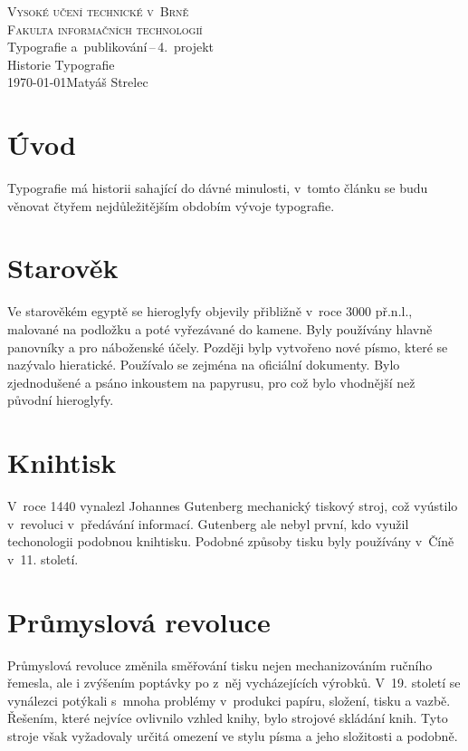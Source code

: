 \documentclass[a4paper, 11pt]{article}
\begin{document}
\begin{titlepage}
    \begin{center}
		{\Huge{\textsc{Vysoké učení technické v~Brně}}\\
        \huge{\textsc{Fakulta informačních technologií}}\\}
		\LARGE{Typografie a~publikování\,{}--\,{}4.\ projekt}\\
        \Huge{Historie Typografie\\}
        {\Large{\today \hfill Matyáš Strelec}}
	\end{center}
\end{titlepage}

\pagebreak

\section{Úvod}
Typografie má historii sahající do dávné minulosti, v~tomto článku se budu věnovat
čtyřem nejdůležitějším obdobím vývoje typografie.

\section{Starověk}
Ve starověkém egyptě se hieroglyfy objevily přibližně v~roce 3000 př.n.l., malované na podložku a poté
vyřezávané do kamene. Byly používány hlavně panovníky a pro náboženské účely. Později bylp vytvořeno nové
písmo, které se nazývalo hieratické. Používalo se zejména na oficiální dokumenty. Bylo zjednodušené a psáno 
inkoustem na papyrusu, pro což bylo vhodnější než původní hieroglyfy\cite{betro1996}\cite{Kleckova2015}.

\section{Knihtisk}
V~roce 1440 vynalezl Johannes Gutenberg mechanický tiskový stroj, což vyústilo v~revoluci v~předávání 
informací\cite{barbier2017}. Gutenberg ale nebyl první, kdo využil techonologii podobnou knihtisku.
Podobné způsoby tisku byly používány v~Číně v~11. století\cite{duchesne2006}\cite{musson1958}.


\section{Průmyslová revoluce}
Průmyslová revoluce změnila směřování tisku nejen mechanizováním ručního řemesla, ale i zvýšením poptávky po
z~něj vycházejících výrobků. V~19. století se vynálezci potýkali s~mnoha problémy v~produkci papíru,
složení, tisku a vazbě. Řešením, které nejvíce ovlivnilo vzhled knihy, bylo strojové skládání knih.
Tyto stroje však vyžadovaly určitá omezení ve stylu písma a jeho složitosti a podobně\cite{history2018}.
\end{document}
